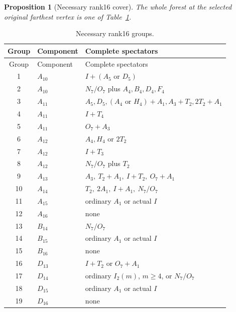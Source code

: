 \documentclass[11pt]{article}
\newtheorem{proposition}[theorem]{Proposition}
\begin{document}
\begin{proposition}[Necessary rank16 cover]\label{prop:f16}
The whole forest at the selected original farthest vertex is one of
Table~\ref{tab:f16}.
\end{proposition}
\begin{longtable}{clp{8cm}}
\caption{Necessary rank16 groups.}\label{tab:f16}\\
\toprule Group&Component&Complete spectators\\\midrule\endfirsthead
\toprule Group&Component&Complete spectators\\\midrule\endhead
1&$A_{10}$&$I+(A_5\text{ or }D_5)$\\
2&$A_{10}$&$N_7/O_7$ plus $A_4,B_4,D_4,F_4$\\
3&$A_{11}$&$A_5,D_5,(A_4\text{ or }H_4)+A_1,A_3+T_2,2T_2+A_1$\\
4&$A_{11}$&$I+T_4$\\
5&$A_{11}$&$O_7+A_3$\\
6&$A_{12}$&$A_4,H_4$ or $2T_2$\\
7&$A_{12}$&$I+T_3$\\
8&$A_{12}$&$N_7/O_7$ plus $T_2$\\
9&$A_{13}$&$A_3,\ T_2+A_1,\ I+T_2,\ O_7+A_1$\\
10&$A_{14}$&$T_2,\ 2A_1,\ I+A_1,\ N_7/O_7$\\
11&$A_{15}$&ordinary $A_1$ or actual $I$\\
12&$A_{16}$&none\\
13&$B_{14}$&$N_7/O_7$\\
14&$B_{15}$&ordinary $A_1$ or actual $I$\\
15&$B_{16}$&none\\
16&$D_{13}$&$I+T_2$ or $O_7+A_1$\\
17&$D_{14}$&ordinary $I_2(m)$, $m\ge4$, or $N_7/O_7$\\
18&$D_{15}$&ordinary $A_1$ or actual $I$\\
19&$D_{16}$&none\\\bottomrule
\end{longtable}
\end{document}
